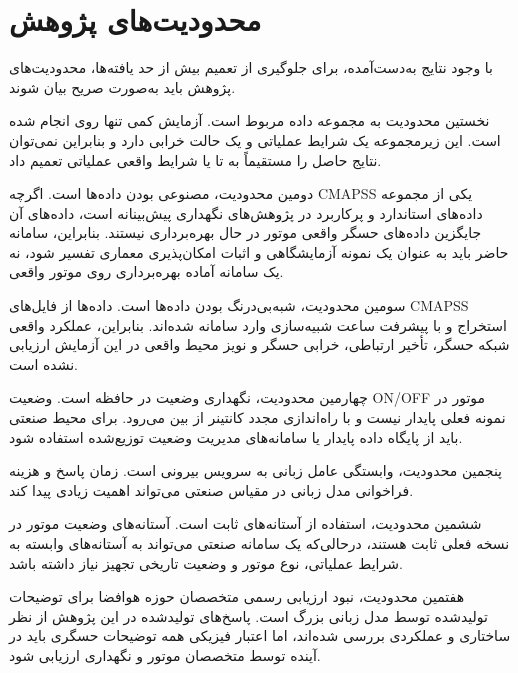 \section{محدودیت‌های پژوهش}
\label{sec:limitations-final}

با وجود نتایج به‌دست‌آمده، برای جلوگیری از تعمیم بیش از حد یافته‌ها، محدودیت‌های پژوهش باید به‌صورت صریح بیان شوند.

نخستین محدودیت به مجموعه داده مربوط است. آزمایش کمی تنها روی  انجام شده است. این زیرمجموعه یک شرایط عملیاتی و یک حالت خرابی دارد و بنابراین نمی‌توان نتایج حاصل را مستقیماً به  تا  یا شرایط واقعی عملیاتی تعمیم داد.

دومین محدودیت، مصنوعی بودن داده‌ها است. اگرچه \gls{CMAPSS} یکی از مجموعه داده‌های استاندارد و پرکاربرد در پژوهش‌های نگهداری پیش‌بینانه است، داده‌های آن جایگزین داده‌های حسگر واقعی موتور در حال بهره‌برداری نیستند. بنابراین، سامانه حاضر باید به عنوان یک نمونه آزمایشگاهی و اثبات امکان‌پذیری معماری تفسیر شود، نه یک سامانه آماده بهره‌برداری روی موتور واقعی.

سومین محدودیت، شبه‌بی‌درنگ بودن داده‌ها است. داده‌ها از فایل‌های CMAPSS استخراج و با پیشرفت ساعت شبیه‌سازی وارد سامانه شده‌اند. بنابراین، عملکرد واقعی شبکه حسگر، تأخیر ارتباطی، خرابی حسگر و نویز محیط واقعی در این آزمایش ارزیابی نشده است.

چهارمین محدودیت، نگهداری وضعیت در حافظه است. وضعیت ON/OFF موتور در نمونه فعلی پایدار نیست و با راه‌اندازی مجدد کانتینر از بین می‌رود. برای محیط صنعتی باید از پایگاه داده پایدار یا سامانه‌های مدیریت وضعیت توزیع‌شده استفاده شود.

پنجمین محدودیت، وابستگی عامل زبانی به سرویس بیرونی است. زمان پاسخ و هزینه فراخوانی مدل زبانی در مقیاس صنعتی می‌تواند اهمیت زیادی پیدا کند.

ششمین محدودیت، استفاده از آستانه‌های ثابت است. آستانه‌های وضعیت موتور در نسخه فعلی ثابت هستند، درحالی‌که یک سامانه صنعتی می‌تواند به آستانه‌های وابسته به شرایط عملیاتی، نوع موتور و وضعیت تاریخی تجهیز نیاز داشته باشد.

هفتمین محدودیت، نبود ارزیابی رسمی متخصصان حوزه هوافضا برای توضیحات تولیدشده توسط مدل زبانی بزرگ است. پاسخ‌های تولیدشده در این پژوهش از نظر ساختاری و عملکردی بررسی شده‌اند، اما اعتبار فیزیکی همه توضیحات حسگری باید در آینده توسط متخصصان موتور و نگهداری ارزیابی شود.




